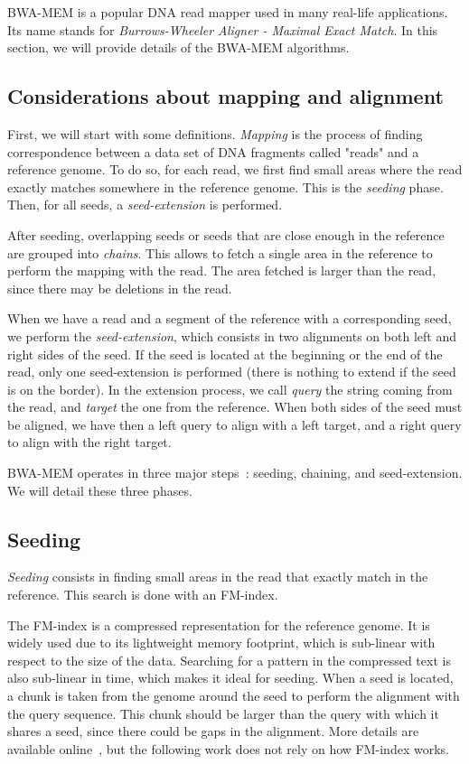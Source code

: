 
BWA-MEM is a popular DNA read mapper used in many real-life applications. Its name stands for \emph{Burrows-Wheeler Aligner - Maximal Exact Match}. In this section, we will provide details of the BWA-MEM algorithms.

\subsection{Considerations about mapping and alignment}
First, we will start with some definitions. \emph{Mapping} is the process of finding correspondence between a data set of DNA fragments called "reads" and a reference genome. To do so, for each read, we first find small areas where the read exactly matches somewhere in the reference genome. This is the \emph{seeding} phase. Then, for all seeds, a \emph{seed-extension} is performed. 

After seeding, overlapping seeds or seeds that are close enough in the reference are grouped into \emph{chains}. This allows to fetch a single area in the reference to perform the mapping with the read. The area fetched is larger than the read, since there may be deletions in the read.

When we have a read and a segment of the reference with a corresponding seed, we perform the \emph{seed-extension}, which consists in two alignments on both left and right sides of the seed. If the seed is located at the beginning or the end of the read, only one seed-extension is performed (there is nothing to extend if the seed is on the border). In the extension process, we call \emph{query} the string coming from the read, and \emph{target} the one from the reference. When both sides of the seed must be aligned, we have then a left query to align with a left target, and a right query to align with the right target.

BWA-MEM operates in three major steps~\cite{li:bwamem}: seeding, chaining, and seed-extension. We will detail these three phases.

\subsection{Seeding}
\emph{Seeding} consists in finding small areas in the read that exactly match in the reference. This search is done with an FM-index.

The FM-index is a compressed representation for the reference genome. It is widely used due to its lightweight memory footprint, which is sub-linear with respect to the size of the data. Searching for a pattern in the compressed text is also sub-linear in time, which makes it ideal for seeding. When a seed is located, a chunk is taken from the genome around the seed to perform the alignment with the query sequence. This chunk should be larger than the query with which it shares a seed, since there could be gaps in the alignment. More details are available online~\cite{wiki:FMIndex}, but the following work does not rely on how FM-index works. 

